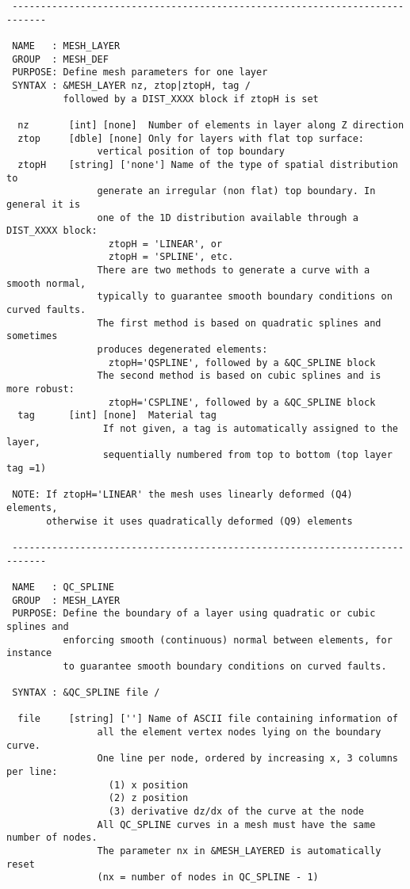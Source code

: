 \begin{verbatim}
 ----------------------------------------------------------------------------

 NAME   : MESH_LAYER
 GROUP  : MESH_DEF
 PURPOSE: Define mesh parameters for one layer
 SYNTAX : &MESH_LAYER nz, ztop|ztopH, tag /
          followed by a DIST_XXXX block if ztopH is set

  nz       [int] [none]  Number of elements in layer along Z direction
  ztop     [dble] [none] Only for layers with flat top surface: 
                vertical position of top boundary
  ztopH    [string] ['none'] Name of the type of spatial distribution to 
                generate an irregular (non flat) top boundary. In general it is
                one of the 1D distribution available through a DIST_XXXX block: 
                  ztopH = 'LINEAR', or 
                  ztopH = 'SPLINE', etc. 
                There are two methods to generate a curve with a smooth normal, 
                typically to guarantee smooth boundary conditions on curved faults.
                The first method is based on quadratic splines and sometimes 
                produces degenerated elements:
                  ztopH='QSPLINE', followed by a &QC_SPLINE block
                The second method is based on cubic splines and is more robust:
                  ztopH='CSPLINE', followed by a &QC_SPLINE block
  tag      [int] [none]  Material tag
                 If not given, a tag is automatically assigned to the layer, 
                 sequentially numbered from top to bottom (top layer tag =1)

 NOTE: If ztopH='LINEAR' the mesh uses linearly deformed (Q4) elements,
       otherwise it uses quadratically deformed (Q9) elements

 ----------------------------------------------------------------------------

 NAME   : QC_SPLINE
 GROUP  : MESH_LAYER
 PURPOSE: Define the boundary of a layer using quadratic or cubic splines and
          enforcing smooth (continuous) normal between elements, for instance
          to guarantee smooth boundary conditions on curved faults.
          
 SYNTAX : &QC_SPLINE file /

  file     [string] [''] Name of ASCII file containing information of
                all the element vertex nodes lying on the boundary curve.
                One line per node, ordered by increasing x, 3 columns per line:
                  (1) x position
                  (2) z position
                  (3) derivative dz/dx of the curve at the node
                All QC_SPLINE curves in a mesh must have the same number of nodes.
                The parameter nx in &MESH_LAYERED is automatically reset
                (nx = number of nodes in QC_SPLINE - 1)


\end{verbatim}

